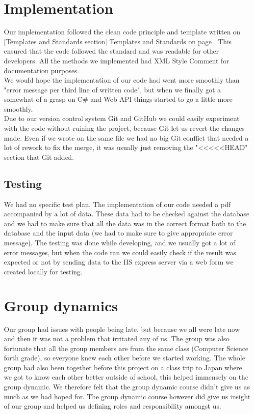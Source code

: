 \section{Implementation}
Our implementation followed the clean code principle and template written on \ref{Templates and Standards section} Templates and Standards on page \pageref{Templates and Standards section}. This ensured that the code followed the standard and was readable for other developers. All the methods we implemented had XML Style Comment for documentation purposes. \\
We would hope the implementation of our code had went more smoothly than "error message per third line of written code", but when we finally got a somewhat of a grasp on C\# and Web API things started to go a little more smoothly.\\
Due to our version control system Git and GitHub we could easily experiment with the code without ruining the project, because Git let us revert the changes made. Even if we wrote on the same file we had no big Git conflict that needed a lot of rework to fix the merge, it was usually just removing the "<<<<<HEAD" section that Git added.

\subsection{Testing}
We had no specific test plan. The implementation of our code needed a pdf accompanied by a lot of data. These data had to be checked against the database and we had to make sure that all the data was in the correct format both to the database and the input data (we had to make sure to give appropriate error message). The testing was done while developing, and we usually got a lot of error messages, but when the code ran we could easily check if the result was expected or not by sending data to the IIS express server via a web form we created locally for testing.

\section{Group dynamics}
Our group had issues with people being late, but because we all were late now and then it was not a problem that irritated any of us. The group was also fortunate that all the group members are from the same class (Computer Science forth grade), so everyone knew each other before we started working. The whole group had also been together before this project on a class trip to Japan where we got to know each other better outside of school, this helped immensely on the group dynamic. We therefore felt that the group dynamic course didn't give us as much as we had hoped for. The group dynamic course however did give us insight of our group and helped us defining roles and responsibility amongst us.